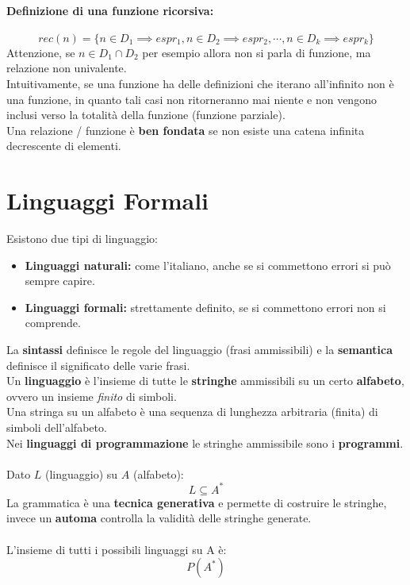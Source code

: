 \documentclass[a4paper,12pt]{article}
\let\oldsection\section
\renewcommand{\section}{\clearpage\oldsection}
\begin{document}
\paragraph{Definizione di una funzione ricorsiva:}
\[
rec(n) = \{n \in D_1 \implies espr_1, n \in D_2 \implies espr_2, \cdots , n \in D_k \implies espr_k\}
\]
Attenzione, se $n \in D_1 \cap D_2$ per esempio allora non si parla di funzione, ma relazione non univalente.\\
Intuitivamente, se una funzione ha delle definizioni che iterano all'infinito non è una funzione, in quanto tali casi non ritorneranno mai niente e non vengono inclusi verso la totalità della funzione (funzione parziale).\\
Una relazione / funzione è \textbf{ben fondata} se non esiste una catena infinita decrescente di elementi.\\

\section{Linguaggi Formali}
Esistono due tipi di linguaggio:
\begin{itemize}
    \item \textbf{Linguaggi naturali: } come l'italiano, anche se si commettono errori si può sempre capire.
    \item \textbf{Linguaggi formali: } strettamente definito, se si commettono errori non si comprende.
\end{itemize}
La \textbf{sintassi} definisce le regole del linguaggio (frasi ammissibili) e la \textbf{semantica} definisce il significato delle varie frasi.\\
Un \textbf{linguaggio} è l'insieme di tutte le \textbf{stringhe} ammissibili su un certo \textbf{alfabeto}, ovvero un insieme \emph{finito} di simboli.\\
Una stringa su un alfabeto è una sequenza di lunghezza arbitraria (finita) di simboli dell'alfabeto.\\
Nei \textbf{linguaggi di programmazione} le stringhe ammissibile sono i \textbf{programmi}.\\\\
Dato $L$ (linguaggio) su $A$ (alfabeto):
\[
L \subseteq A^*
\]
La grammatica è una \textbf{tecnica generativa} e permette di costruire le stringhe, invece un \textbf{automa} controlla la validità delle stringhe generate.\\\\
L'insieme di tutti i possibili linguaggi su A è:
\[
P(A^*)
\]
\end{document}

